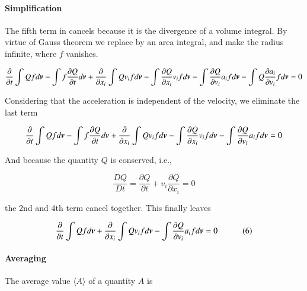 \paragraph{Simplification}


The fifth term in  cancels because it is the divergence of a volume integral. By virtue of Gauss theorem we replace by an area integral, and make the radius infinite, where $f$ vanishes. 

\begin{equation}
\frac{\partial }{\partial t}  \int Q f d{\boldsymbol{v}}   - \int f \frac{\partial Q}{\partial t} d{\boldsymbol{v}} +  \frac{\partial}{\partial x_i}\int Q v_i f  d{\boldsymbol{v}}   -\int \frac{\partial Q}{\partial x_i} v_i f  d{\boldsymbol{v}} - \int \frac{\partial Q}{\partial v_i} a_i f  d{\boldsymbol{v}} - \int Q \frac{\partial a_i}{\partial v_i} f  d{\boldsymbol{v}} = 0 
\end{equation}


\noindent Considering that the acceleration is independent of the velocity, we eliminate the last term 


\begin{equation}
\frac{\partial }{\partial t}  \int Q f d{\boldsymbol{v}}   - \int f \frac{\partial Q}{\partial t} d{\boldsymbol{v}} +  \frac{\partial}{\partial x_i}\int Q v_i f  d{\boldsymbol{v}}   -\int \frac{\partial Q}{\partial x_i} v_i f  d{\boldsymbol{v}} - \int \frac{\partial Q}{\partial v_i} a_i f  d{\boldsymbol{v}} = 0 
\end{equation}

\noindent And because the quantity $Q$ is conserved, i.e., 

\begin{equation}
\frac{D Q}{D t}  = \frac{\partial Q}{\partial t}  + v_i\frac{\partial Q}{\partial x_i} = 0
\end{equation}

\noindent the 2nd and 4th term cancel together. This finally leaves 

\begin{equation}
\frac{\partial }{\partial t}  \int Q f d{\boldsymbol{v}}   +  \frac{\partial}{\partial x_i}\int Q v_i f  d{\boldsymbol{v}}   - \int \frac{\partial Q}{\partial v_i} a_i f  d{\boldsymbol{v}} = 0 \quad\quad\quad (\mathrm{6})
\end{equation}

\paragraph{Averaging}

The average value $\langle A \rangle$ of a quantity $A$ is 

